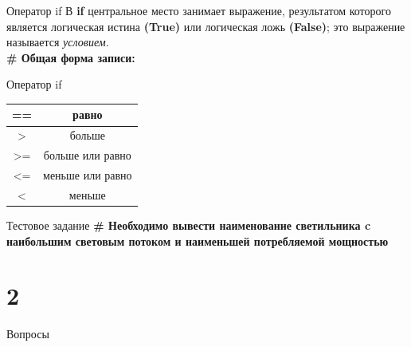 \documentclass[12pt]{beamer}
\begin{document}
\begin{frame}{Оператор if}
В \textbf{if} центральное место занимает выражение, результатом которого является логическая истина \textbf{(True)} или логическая ложь \textbf{(False)}; это выражение называется \textit{условием}.\\
\vspace{0.5cm}
\textbf{\# Общая форма записи:}
\vspace{0.5cm}

\vspace{0.5cm}
\end{frame}


\begin{frame}{Оператор if}
\begin{tabular}{|c|c|}
\hline 
== & равно \\ 
\hline 
> & больше \\ 
\hline 
>= & больше или равно \\ 
\hline 
<= & меньше или равно \\ 
\hline 
< & меньше \\ 
\hline 
\end{tabular} 
\par
\vspace{0.5cm}

\end{frame}


\begin{frame}{Тестовое задание}
\textbf{\# Необходимо вывести наименование светильника c наибольшим световым потоком и наименьшей потребляемой мощностью} 
\vspace{0.5cm}

\vspace{0.5cm}
\end{frame}


\part{2}
\begin{frame}[t]{Вопросы}
\vspace{0.7cm}
 \\
\end{frame}
\end{document}
